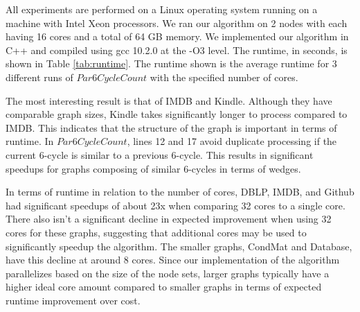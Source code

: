 \documentclass[11pt]{article}
\begin{document}
\begin{table}[h]
  \caption{Runtime (seconds)}
  \label{tab:runtime}
  \centering
\end{table}

All experiments are performed on a Linux operating system running on a machine with Intel Xeon processors.
We ran our algorithm on 2 nodes with each having 16 cores and a total of 64 GB memory.
We implemented our algorithm in C++ and compiled using gcc 10.2.0 at the -O3 level.
The runtime, in seconds, is shown in Table \ref{tab:runtime}.
The runtime shown is the average runtime for 3 different runs of $Par6CycleCount$ with the specified number of cores.

The most interesting result is that of IMDB and Kindle.
Although they have comparable graph sizes, Kindle takes significantly longer to process compared to IMDB.
This indicates that the structure of the graph is important in terms of runtime.
In $Par6CycleCount$, lines 12 and 17 avoid duplicate processing if the current 6-cycle is similar to a previous 6-cycle.
This results in significant speedups for graphs composing of similar 6-cycles in terms of wedges.

In terms of runtime in relation to the number of cores, DBLP, IMDB, and Github had significant speedups of about 23x when comparing 32 cores to a single core.
There also isn't a significant decline in expected improvement when using 32 cores for these graphs, suggesting that additional cores may be used to significantly speedup the algorithm.
The smaller graphs, CondMat and Database, have this decline at around 8 cores.
Since our implementation of the algorithm parallelizes based on the size of the node sets, larger graphs typically have a higher ideal core amount compared to smaller graphs in terms of expected runtime improvement over cost.
\end{document}

